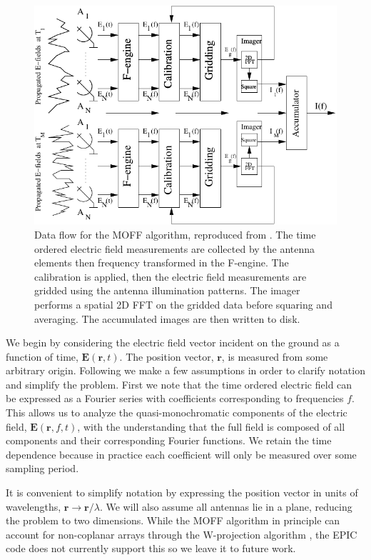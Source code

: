\documentclass[a4paper,fleqn,usenatbib]{mnras}
\begin{document}
\begin{figure}
\begin{center}
\includegraphics[width=\columnwidth]{fig1.pdf}
\caption{Data flow for the MOFF algorithm, reproduced from \citealt{thy15c}. The time ordered 
electric field measurements are collected by the antenna elements then frequency transformed in the 
F-engine. The calibration is applied, then the electric field measurements are gridded using the 
antenna illumination patterns. The imager performs a spatial 2D FFT on the gridded data before 
squaring and averaging. The accumulated images are then written to disk.}
\label{fig:moff_flow}
\end{center}
\end{figure}

We begin by considering the electric field vector incident on the ground as a function of time, 
$\mathbf{E}(\mathbf{r},t)$. The position vector, $\mathbf{r}$, is measured from some arbitrary 
origin. Following \citealt{cla99} we make a few assumptions in order to clarify notation and 
simplify the problem. First we note that the time ordered electric field can be expressed as a 
Fourier series with coefficients corresponding to frequencies $f$. This allows us to analyze the 
quasi-monochromatic components of the electric field, $\mathbf{E}(\mathbf{r},f,t)$, with the 
understanding that the full field is composed of all components and their corresponding Fourier 
functions. We retain the time dependence because in practice each coefficient will only be 
measured over some sampling period. 

It is convenient to simplify notation by expressing the position vector in units of wavelengths, 
$\mathbf{r}\rightarrow \mathbf{r}/\lambda$. We will also assume all antennas lie in a plane, 
reducing the problem to two dimensions. While the MOFF algorithm in principle can account for 
non-coplanar arrays through the W-projection algorithm \citep{cor08}, the EPIC code does not 
currently support this so we leave it to future work.
\end{document}
